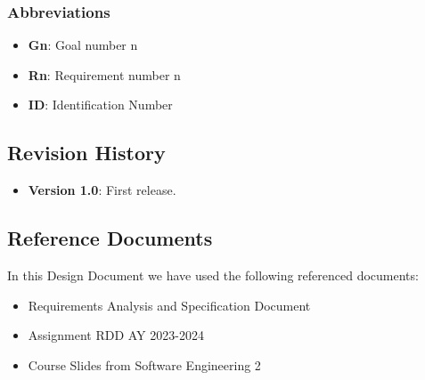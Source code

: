 \documentclass[12pt,oneside,a4paper]{article}
\begin{document}
\subsubsection{Abbreviations}
\begin{itemize}
    \item \textbf{Gn}: Goal number n
    \item \textbf{Rn}: Requirement number n
    \item \textbf{ID}: Identification Number
\end{itemize}


\subsection{Revision History}
\begin{itemize}
    \item \textbf{Version 1.0}: First release.
\end{itemize}

\subsection{Reference Documents}
In this Design Document we have used the following referenced documents:

\begin{itemize}
    \item Requirements Analysis and Specification Document
    \item Assignment RDD AY 2023-2024
    \item Course Slides from Software Engineering 2
\end{itemize}
\end{document}

